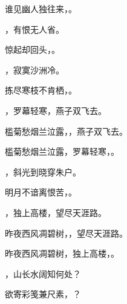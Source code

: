 \documentclass[12pt, a4paper, addpoints]{exam}
\begin{document}
\begin{questions}
\question[2] 谁见幽人独往来，\uline{\qquad\qquad\qquad\qquad}。

\question[2] \uline{\qquad\qquad\qquad\qquad}，有恨无人省。

\question[2] 惊起却回头，\uline{\qquad\qquad\qquad\qquad}。

\question[2] \uline{\qquad\qquad\qquad\qquad}，寂寞沙洲冷。

\question[2] 拣尽寒枝不肯栖，\uline{\qquad\qquad\qquad\qquad}。

\question[2] \uline{\qquad\qquad\qquad\qquad}，罗幕轻寒，燕子双飞去。

\question[2] 槛菊愁烟兰泣露，\uline{\qquad\qquad\qquad\qquad}，燕子双飞去。

\question[2] 槛菊愁烟兰泣露，罗幕轻寒，\uline{\qquad\qquad\qquad\qquad}。

\question[2] \uline{\qquad\qquad\qquad\qquad}，斜光到晓穿朱户。

\question[2] 明月不谙离恨苦，\uline{\qquad\qquad\qquad\qquad}。

\question[2] \uline{\qquad\qquad\qquad\qquad}，独上高楼，望尽天涯路。

\question[2] 昨夜西风凋碧树，\uline{\qquad\qquad\qquad\qquad}，望尽天涯路。

\question[2] 昨夜西风凋碧树，独上高楼，\uline{\qquad\qquad\qquad\qquad}。

\question[2] \uline{\qquad\qquad\qquad\qquad}，山长水阔知何处？

\question[2] 欲寄彩笺兼尺素，\uline{\qquad\qquad\qquad\qquad}？

\question[1] 

\end{questions}
\end{document}
